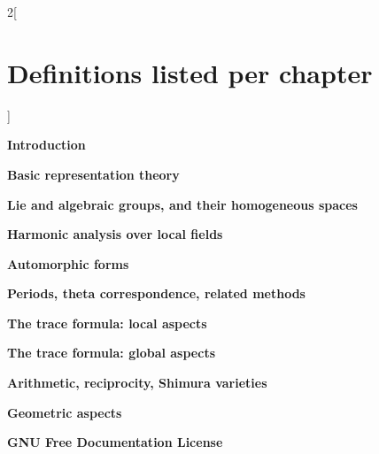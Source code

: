 \documentclass[oneside]{stacks-project-book}
\theoremstyle{plain}
\theoremstyle{definition}
\theoremstyle{remark}
\numberwithin{equation}{subsection}
\begin{document}
\begin{multicols}{2}[\section{Definitions listed per chapter}\label{index-section-per-chapter}]

\medskip\noindent
{\bf Introduction}

\medskip

\medskip\noindent
{\bf Basic representation theory}

\medskip

\medskip\noindent
{\bf Lie and algebraic groups, and their homogeneous spaces}

\medskip

\medskip\noindent
{\bf Harmonic analysis over local fields}

\medskip

\medskip\noindent
{\bf Automorphic forms}

\medskip

\medskip\noindent
{\bf Periods, theta correspondence, related methods}

\medskip

\medskip\noindent
{\bf The trace formula: local aspects}

\medskip

\medskip\noindent
{\bf The trace formula: global aspects}

\medskip

\medskip\noindent
{\bf Arithmetic, reciprocity, Shimura varieties}

\medskip

\medskip\noindent
{\bf Geometric aspects}

\medskip

\medskip\noindent
{\bf GNU Free Documentation License}

\medskip
\end{multicols}
\end{document}
